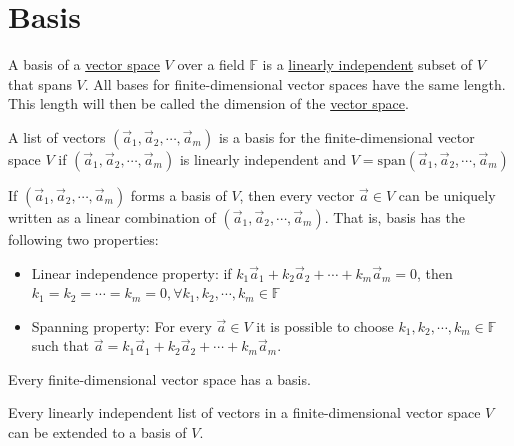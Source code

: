 \documentclass[conference,final,11pt,technote,onecolumn]{IEEEtran}\usepackage[]{graphicx}\usepackage[]{color}
\begin{document}
	\section{Basis}
	\label{term:basis}
A basis of a \hyperref[term:vector_space]{vector space} $V$ over a field $\mathbb{F}$ is a \hyperref[term:linearly_independent_vectors]{linearly independent} subset of $V$ that spans $V$. All bases for finite-dimensional vector spaces have the same length. This length will then be called the dimension of the \hyperref[term:vector_space]{vector space}.

A list of vectors $(\vec a_1, \vec a_2, \cdots, \vec a_m)$ is a basis for the finite-dimensional vector space $V$ if $(\vec a_1, \vec a_2, \cdots, \vec a_m)$ is linearly independent and $V = \text{span}(\vec a_1, \vec a_2, \cdots, \vec a_m)$

If $(\vec a_1, \vec a_2, \cdots, \vec a_m)$ forms a basis of $V$, then every vector $\vec a\in V$ can be uniquely written as a linear combination of $(\vec a_1, \vec a_2, \cdots, \vec a_m)$. That is, basis has the following two properties:

\begin{itemize}
\item Linear independence property: if $k_1\vec a_1 + k_2\vec a_2 + \cdots + k_m\vec a_m = 0$, then $k_1 = k_2 = \cdots = k_m = 0, \forall k_1, k_2, \cdots, k_m\in \mathbb{F}$
\item Spanning property: For every $\vec a\in V$ it is possible to choose $k_1, k_2, \cdots, k_m\in \mathbb{F}$ such that $\vec a = k_1\vec a_1 + k_2\vec a_2 + \cdots + k_m\vec a_m$.
\end{itemize}

Every finite-dimensional vector space has a basis.

Every linearly independent list of vectors in a finite-dimensional vector space $V$ can be extended to a basis of $V$.
\end{document}

